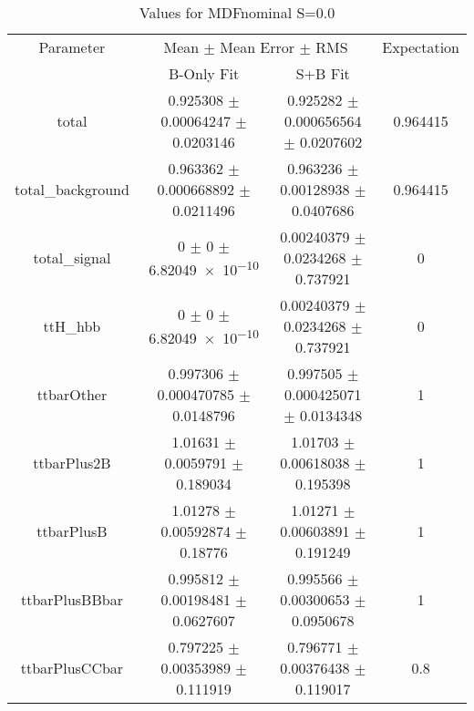 \begin{table}
\centering
\caption{Values for MDFnominal S=0.0}
\begin{tabular}{cccc}
\toprule
Parameter & \multicolumn{2}{c}{Mean $\pm$ Mean Error $\pm$ RMS} & Expectation\\
 & B-Only Fit & S+B Fit & \\
\midrule
total & \num{0.925308} $\pm$ \num{0.00064247} $\pm$ \num{0.0203146} & \num{0.925282} $\pm$ \num{0.000656564} $\pm$ \num{0.0207602} & \num{0.964415}\\
total\_background & \num{0.963362} $\pm$ \num{0.000668892} $\pm$ \num{0.0211496} & \num{0.963236} $\pm$ \num{0.00128938} $\pm$ \num{0.0407686} & \num{0.964415}\\
total\_signal & \num{0} $\pm$ \num{0} $\pm$ \num{6.82049e-10} & \num{0.00240379} $\pm$ \num{0.0234268} $\pm$ \num{0.737921} & \num{0}\\
ttH\_hbb & \num{0} $\pm$ \num{0} $\pm$ \num{6.82049e-10} & \num{0.00240379} $\pm$ \num{0.0234268} $\pm$ \num{0.737921} & \num{0}\\
ttbarOther & \num{0.997306} $\pm$ \num{0.000470785} $\pm$ \num{0.0148796} & \num{0.997505} $\pm$ \num{0.000425071} $\pm$ \num{0.0134348} & \num{1}\\
ttbarPlus2B & \num{1.01631} $\pm$ \num{0.0059791} $\pm$ \num{0.189034} & \num{1.01703} $\pm$ \num{0.00618038} $\pm$ \num{0.195398} & \num{1}\\
ttbarPlusB & \num{1.01278} $\pm$ \num{0.00592874} $\pm$ \num{0.18776} & \num{1.01271} $\pm$ \num{0.00603891} $\pm$ \num{0.191249} & \num{1}\\
ttbarPlusBBbar & \num{0.995812} $\pm$ \num{0.00198481} $\pm$ \num{0.0627607} & \num{0.995566} $\pm$ \num{0.00300653} $\pm$ \num{0.0950678} & \num{1}\\
ttbarPlusCCbar & \num{0.797225} $\pm$ \num{0.00353989} $\pm$ \num{0.111919} & \num{0.796771} $\pm$ \num{0.00376438} $\pm$ \num{0.119017} & \num{0.8}\\
\bottomrule
\end{tabular}
\end{table}
